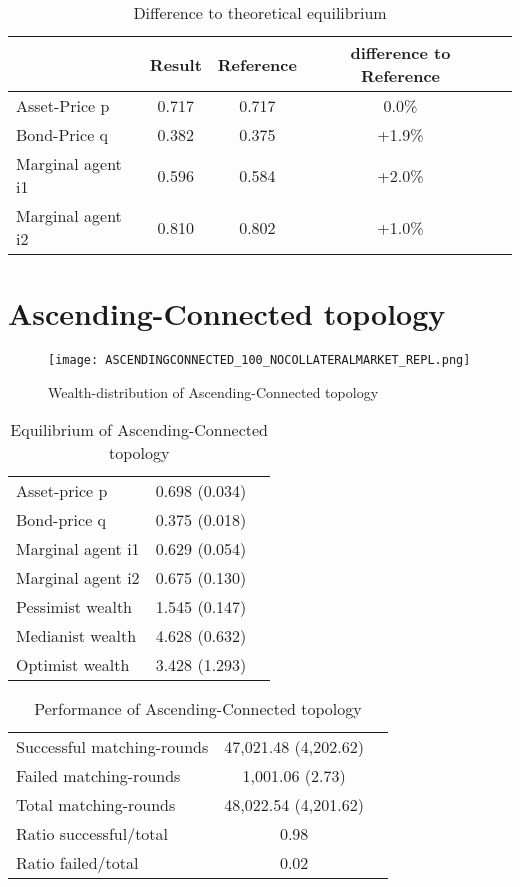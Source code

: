 \documentclass[Bachelorarbeit.tex]{subfiles}
\begin{document}
\begin{table}[H]
	\caption{Difference to theoretical equilibrium}
	\centering
	\begin{tabular} { l c c c r }
		& Result & Reference & difference to Reference \\
		\hline
		Asset-Price p & 0.717 & 0.717 & 0.0\% \\
		Bond-Price q & 0.382 & 0.375 & +1.9\% \\
		Marginal agent i1 & 0.596  & 0.584 & +2.0\% \\
		Marginal agent i2 & 0.810 & 0.802 & +1.0\% \\
		\hline
	\end{tabular}
\end{table}

\section{Ascending-Connected topology} 

\begin{figure}[H]
	\centering
  \texttt{[image: ASCENDINGCONNECTED\_100\_NOCOLLATERALMARKET\_REPL.png]}
	\caption{Wealth-distribution of Ascending-Connected topology}
	\label{fig:wealth_ASCENDINGCONNECTED_100_NOCOLLATERALMARKET_REPL}
\end{figure}

\begin{table}[H]
	\caption{Equilibrium of Ascending-Connected topology}
	\centering
	\begin{tabular} { l c r }
		\hline
		Asset-price p & 0.698 (0.034) \\
		Bond-price q & 0.375 (0.018) \\
		Marginal agent i1 & 0.629 (0.054) \\
		Marginal agent i2 & 0.675 (0.130) \\
		\hline
		Pessimist wealth & 1.545 (0.147) \\
		Medianist wealth & 4.628 (0.632) \\
		Optimist wealth & 3.428 (1.293) \\
		\hline
	\end{tabular}
	\label{tab:ascendingconnected_equilibrium_100Agents_05Bond}
\end{table} 

\begin{table}[H]
	\caption{Performance of Ascending-Connected topology}
	\centering
	\begin{tabular} { l c r }
		\hline
		Successful matching-rounds & 47,021.48 (4,202.62) \\
		Failed matching-rounds & 1,001.06 (2.73) \\
		Total matching-rounds & 48,022.54 (4,201.62) \\
		\hline
		Ratio successful/total & 0.98 \\
		Ratio failed/total & 0.02 \\
		\hline
	\end{tabular}
\end{table}
\end{document}
